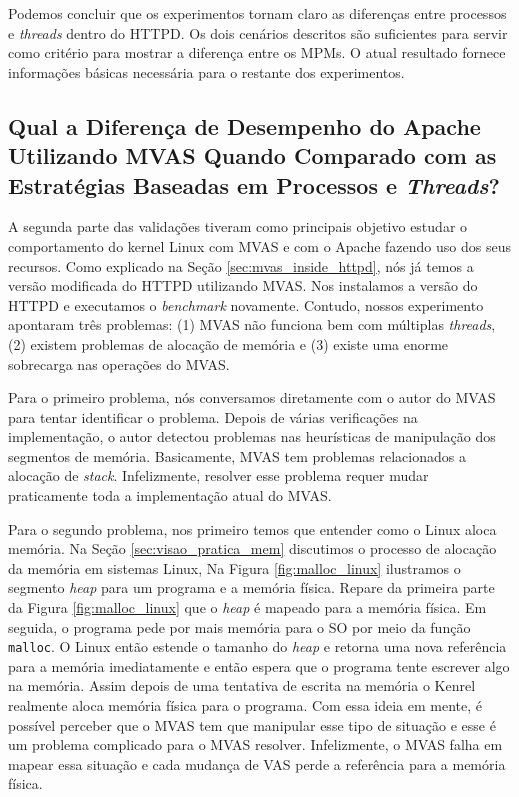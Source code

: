 Podemos concluir que os experimentos tornam claro as diferenças entre processos
e \emph{threads} dentro do HTTPD. Os dois cenários descritos são suficientes
para servir como critério para mostrar a diferença entre os MPMs. O atual
resultado fornece informações básicas necessária para o restante dos
experimentos.

\subsection{Qual a Diferença de Desempenho do Apache Utilizando MVAS Quando
Comparado com as Estratégias Baseadas em Processos e \emph{Threads}?}

A segunda parte das validações tiveram como principais objetivo estudar o
comportamento do kernel Linux com MVAS e com o Apache fazendo uso dos seus
recursos. Como explicado na Seção \ref{sec:mvas_inside_httpd}, nós já temos a
versão modificada do HTTPD utilizando MVAS. Nos instalamos a versão do HTTPD e
executamos o \emph{benchmark} novamente. Contudo, nossos experimento apontaram
três problemas: (1) MVAS não funciona bem com múltiplas \emph{threads}, (2)
existem problemas de alocação de memória e (3) existe uma enorme sobrecarga nas
operações do MVAS.

Para o primeiro problema, nós conversamos diretamente com o autor do MVAS para
tentar identificar o problema. Depois de várias verificações na implementação,
o autor detectou problemas nas heurísticas de manipulação dos segmentos de
memória.  Basicamente, MVAS tem problemas relacionados a alocação de
\emph{stack}.  Infelizmente, resolver esse problema requer mudar praticamente
toda a implementação atual do MVAS.


Para o segundo problema, nos primeiro temos que entender como o Linux aloca
memória. Na Seção \ref{sec:visao_pratica_mem} discutimos o processo de alocação
da memória em sistemas Linux, Na Figura \ref{fig:malloc_linux} ilustramos o
segmento \emph{heap} para um programa e a memória física. Repare da primeira
parte da Figura \ref{fig:malloc_linux} que o \emph{heap} é mapeado para a
memória física. Em seguida, o programa pede por mais memória para o SO por meio
da função \texttt{malloc}. O Linux então estende o tamanho do \emph{heap} e
retorna uma nova referência para a memória imediatamente e então espera que o
programa tente escrever algo na memória. Assim depois de uma tentativa de
escrita na memória o Kenrel realmente aloca memória física para o programa. Com
essa ideia em mente, é possível perceber que o MVAS tem que manipular esse tipo
de situação e esse é um problema complicado para o MVAS resolver. Infelizmente,
o MVAS falha em mapear essa situação e cada mudança de VAS perde a referência
para a memória física.

